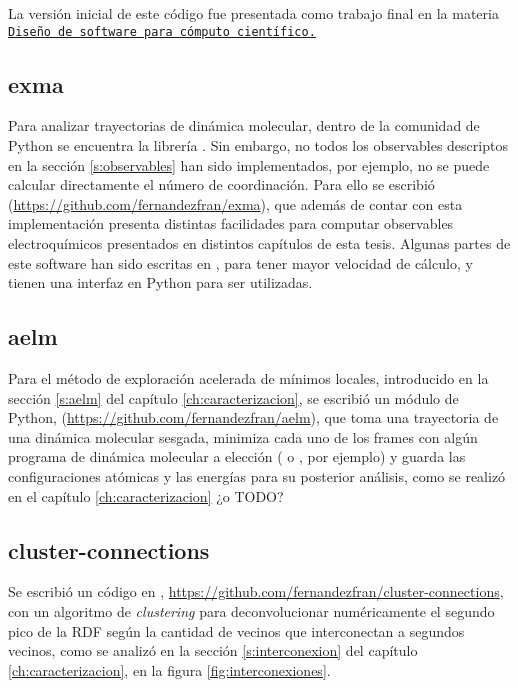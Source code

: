 

La versión inicial de este código fue presentada como trabajo final en la materia
\href{https://github.com/leliel12/diseno_sci_sfw}{\tt Diseño de software para 
cómputo científico.}

\subsection{exma}
Para analizar trayectorias de dinámica molecular, dentro de la comunidad de Python
se encuentra la librería  \cite{mdanalysis1, mdanalysis2}. Sin
embargo, no todos los observables descriptos en la sección \ref{s:observables}
han sido implementados, por ejemplo, no se puede calcular directamente el número
de coordinación. Para ello se escribió 
(\url{https://github.com/fernandezfran/exma}), que además de contar con esta
implementación presenta distintas facilidades para computar observables 
electroquímicos presentados en distintos capítulos de esta tesis. Algunas partes
de este software han sido escritas en , para tener mayor velocidad de 
cálculo, y tienen una interfaz en Python para ser utilizadas.

\subsection{aelm}
Para el método de exploración acelerada de mínimos locales, introducido en 
la sección \ref{s:aelm} del capítulo \ref{ch:caracterizacion}, se escribió un 
módulo de Python,  (\url{https://github.com/fernandezfran/aelm}), que 
toma una trayectoria de una dinámica molecular sesgada, minimiza cada uno de los 
frames con algún programa de dinámica molecular a elección ( o 
, por ejemplo) y guarda las configuraciones atómicas y las energías 
para su posterior análisis, como se realizó en el capítulo 
\ref{ch:caracterizacion} ¿o TODO?

\subsection{cluster-connections}
Se escribió un código en , 
\url{https://github.com/fernandezfran/cluster-connections}, con un algoritmo de
\textit{clustering} para deconvolucionar numéricamente el segundo pico de la RDF
según la cantidad de vecinos que interconectan a segundos vecinos, como se analizó
en la sección \ref{s:interconexion} del capítulo \ref{ch:caracterizacion}, 
en la figura \ref{fig:interconexiones}.
